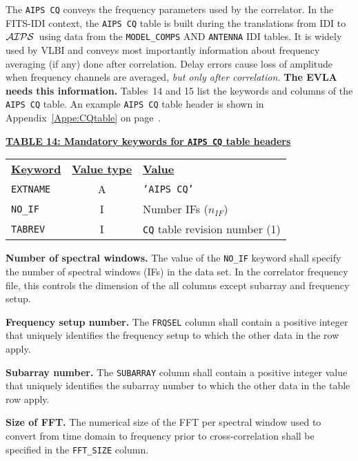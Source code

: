 \documentclass[twoside]{article}
\newcommand{\AIPS}{{$\cal AIPS\/$}}
\newcommand{\nif}{$n_{IF}$}
\begin{document}
The {\tt AIPS CQ} conveys the frequency parameters used by the
correlator.  In the FITS-IDI context, the {\tt AIPS CQ} table
is built during the translations from IDI to \AIPS\ using data from
the {\tt MODEL\_COMPS} AND {\tt ANTENNA} IDI tables.  It is widely
used by VLBI and conveys most importantly information about frequency
averaging (if any) done after correlation.  Delay errors cause loss of
amplitude when frequency channels are averaged, {\it but only after
  correlation.}  {\bf The EVLA needs this information.}  Tables~14 and
15 list the keywords and columns of the {\tt AIPS CQ} table.  An
example {\tt AIPS CQ} table header is shown in
Appendix~\ref{Appe:CQtable} on page~\pageref{Appe:CQtable}.

\begin{center}
\underline{\bf{TABLE 14: Mandatory keywords for {\tt AIPS CQ} table
    headers}}\\
\begin{tabular}{lcl}
\noalign{\vspace{2pt}} \label{ta:CQkeys}
\underline{{\bf Keyword}} & \underline{\bf{Value type}} &
    \underline{\bf{Value\vphantom{y}}} \\
\noalign{\vspace{2pt}}
{\tt EXTNAME}   & A & {\tt 'AIPS CQ'}  \\
{\tt NO\_IF}    & I & Number IFs (\nif) \\
{\tt TABREV}    & I & {\tt CQ} table revision number (1)
\end{tabular}
\end{center}

{\bf Number of spectral windows.} The value of the {\tt NO\_IF}
keyword shall specify the number of spectral windows (IFs) in the data
set.  In the correlator frequency file, this controls the dimension of
the all columns except subarray and frequency setup.

{\bf Frequency setup number.} The {\tt FRQSEL} column shall contain a
positive integer that uniquely identifies the frequency setup to which
the other data in the row apply.

{\bf Subarray number.} The {\tt SUBARRAY} column shall contain a
positive integer value that uniquely identifies the subarray number
to which the other data in the table row apply.

{\bf Size of FFT.} The numerical size of the FFT per spectral window
used to convert from time domain to frequency prior to
cross-correlation shall be specified in the {\tt FFT\_SIZE} column.
\end{document}
